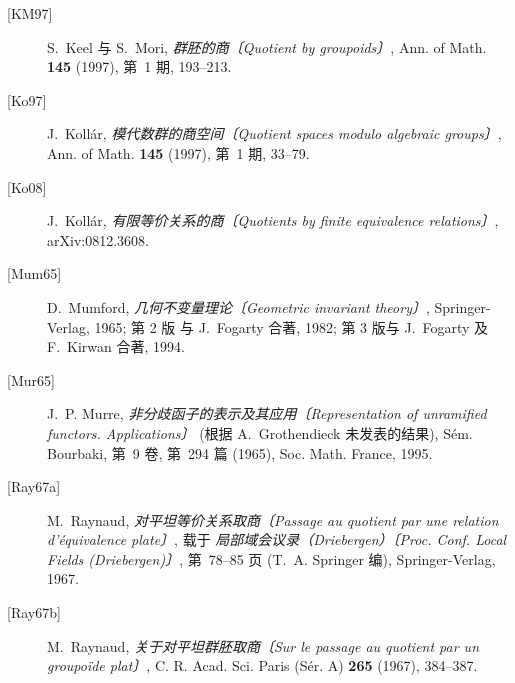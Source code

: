 \begin{description}
\item[{[KM97]}]\label{bib:sga3-V-KM97} S.~Keel 与 S.~Mori,
  \emph{群胚的商〔Quotient by groupoids〕}, Ann. of Math. \textbf{145} (1997),
  第~1 期, 193--213.
\item[{[Ko97]}]\label{bib:sga3-V-Ko97} J.~Koll\'ar,
  \emph{模代数群的商空间〔Quotient spaces modulo algebraic groups〕}, Ann. of Math.
  \textbf{145} (1997), 第~1 期, 33--79.
\item[{[Ko08]}]\label{bib:sga3-V-Ko08} J.~Koll\'ar,
  \emph{有限等价关系的商〔Quotients by finite equivalence relations〕}, arXiv:0812.3608.
\item[{[Mum65]}]\label{bib:sga3-V-Mum65} D.~Mumford,
  \emph{几何不变量理论〔Geometric invariant theory〕}, Springer-Verlag, 1965; 第 2 版
  与 J.~Fogarty 合著, 1982; 第 3 版与 J.~Fogarty 及 F.~Kirwan 合著, 1994.
\item[{[Mur65]}]\label{bib:sga3-V-Mur65} J.~P. Murre,
  \emph{非分歧函子的表示及其应用〔Representation of unramified functors. Applications〕}
  (根据 A.~Grothendieck 未发表的结果), S\'em.
  Bourbaki, 第~9 卷, 第~294 篇 (1965), Soc. Math. France, 1995.
\item[{[Ray67a]}]\label{bib:sga3-V-Ray67a} M.~Raynaud,
  \emph{对平坦等价关系取商〔Passage au quotient par une relation d'\'equivalence plate〕},
  载于 \emph{局部域会议录（Driebergen）〔Proc. Conf. Local Fields (Driebergen)〕}, 第~78--85 页
  (T.~A. Springer 编), Springer-Verlag, 1967.
\item[{[Ray67b]}]\label{bib:sga3-V-Ray67b} M.~Raynaud,
  \emph{关于对平坦群胚取商〔Sur le passage au quotient par un groupo\"ide plat〕},
  C. R. Acad. Sci. Paris (S\'er. A) \textbf{265} (1967), 384--387.
\end{description}


